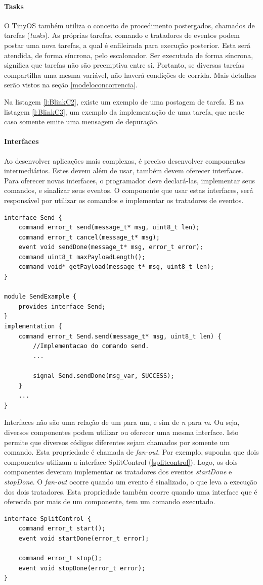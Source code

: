 \paragraph{Tasks}
O TinyOS também utiliza o conceito de procedimento postergados, chamados de tarefas (\textit{tasks}). As próprias
tarefas, comando e tratadores de eventos podem postar uma nova tarefas, a qual é enfileirada para execução posterior.
Esta será atendida, de forma síncrona, pelo escalonador.
Ser executada de forma síncrona, significa que tarefas não são preemptiva entre si. Portanto, se diversas tarefas
compartilha uma mesma variável, não haverá condições de corrida. Mais detalhes serão vistos na seção
\ref{modeloconcorrencia}.



Na listagem \ref{l:BlinkC2}, existe um exemplo de uma postagem de tarefa. E na listagem \ref{l:BlinkC3}, um exemplo da
implementação de uma tarefa, que neste caso somente emite uma mensagem de depuração.

\paragraph{Interfaces}
Ao desenvolver aplicações mais complexas, é preciso desenvolver componentes intermediários. Estes devem além de usar,
também devem oferecer interfaces. Para oferecer novas interfaces, o programador deve declará-las, implementar seus 
comandos, e sinalizar seus eventos. O componente que usar estas interfaces, será responsável por utilizar os comandos e
implementar os tratadores de eventos.
\begin{lstlisting}[caption=interface, label=interface]
interface Send {
    command error_t send(message_t* msg, uint8_t len);
    command error_t cancel(message_t* msg);
    event void sendDone(message_t* msg, error_t error);
    command uint8_t maxPayloadLength();
    command void* getPayload(message_t* msg, uint8_t len);
}

module SendExample {
    provides interface Send;
}
implementation {
    command error_t Send.send(message_t* msg, uint8_t len) {
        //Implementacao do comando send.
        ...

        signal Send.sendDone(msg_var, SUCCESS);
    }
    ...
}
\end{lstlisting}

Interfaces não são uma relação de um para um, e sim de \textit{n} para \textit{m}. Ou seja, diversos componentes podem
utilizar ou oferecer uma mesma interface. Isto permite que diversos códigos diferentes sejam chamados por somente um
comando. Esta propriedade é chamada de \textit{fan-out}. Por exemplo, suponha que dois componentes utilizam a interface
SplitControl (\ref{splitcontrol}). Logo, os dois componentes deveram implementar os tratadores dos eventos
\textit{startDone} e \textit{stopDone}. O \textit{fan-out} ocorre quando um evento é sinalizado, o que leva a execução dos 
dois tratadores. Esta propriedade também ocorre quando uma interface que é oferecida por mais de um componente, tem um
comando executado.

\begin{lstlisting}[caption=SplitControl, label=splitcontrol]
interface SplitControl {
    command error_t start();
    event void startDone(error_t error);
    
    command error_t stop();
    event void stopDone(error_t error);
}
\end{lstlisting}
